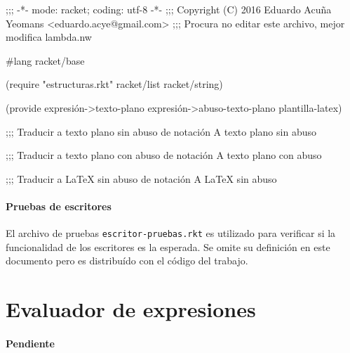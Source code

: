\documentclass[letterpaper,twoside,openright,11pt]{book}
\begin{document}
\nwenddocs{}\endmoddef
;;; -*- mode: racket; coding: utf-8 -*-
;;; Copyright (C) 2016 Eduardo Acuña Yeomans <eduardo.acye@gmail.com>
;;; Procura no editar este archivo, mejor modifica lambda.nw

#lang racket/base

(require "estructuras.rkt"
         racket/list
         racket/string)

(provide expresión->texto-plano
         expresión->abuso-texto-plano
         plantilla-latex)

;;; Traducir a texto plano sin abuso de notación
\LA{}A texto plano sin abuso~{\nwtagstyle{}}\RA{}

;;; Traducir a texto plano con abuso de notación
\LA{}A texto plano con abuso~{\nwtagstyle{}}\RA{}

;;; Traducir a LaTeX sin abuso de notación
\LA{}A LaTeX sin abuso~{\nwtagstyle{}}\RA{}
\nwendcode{}\nwdocspar

\nwenddocs{}\paragraph{Pruebas de escritores} El archivo de pruebas {\tt{}escritor-pruebas.rkt} es utilizado para verificar si la funcionalidad de los escritores es la esperada. Se omite su definición en este documento pero es distribuído con el código del trabajo.


\nwenddocs{}\section*{Evaluador de expresiones}

\paragraph{Pendiente}
\end{document}
